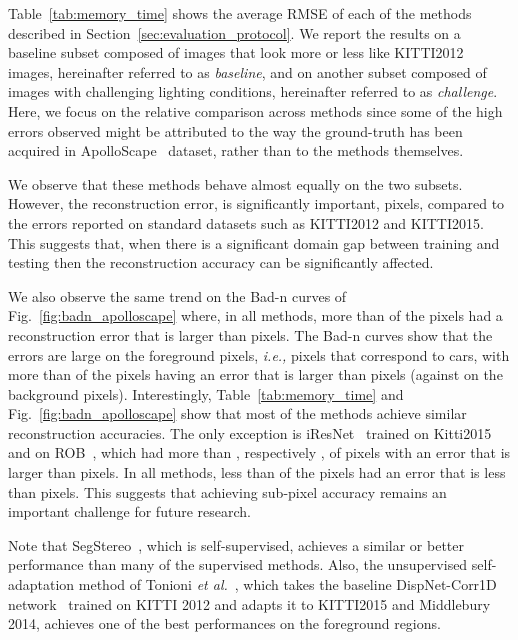 \documentclass[10pt,journal,compsoc]{IEEEtran}
\newcommand{\ie}{\emph{i.e., }}
\newcommand{\etal}{\emph{et al.}}
\begin{document}
 
Table~\ref{tab:memory_time}  shows the   average RMSE of each of the methods described in Section~\ref{sec:evaluation_protocol}.  We report the results on a baseline subset composed of  images that look more or less like KITTI2012 images, hereinafter referred to as \emph{baseline}, and on another subset composed of  images with challenging lighting conditions, hereinafter referred to as \emph{challenge}.  Here, we focus on the relative comparison across methods since some of the high errors observed  might be attributed to the way the ground-truth has been acquired in ApolloScape~\cite{wang2019apolloscape} dataset, rather than to the methods themselves. 


We observe that  these methods behave almost equally on the two subsets. However,  the reconstruction error,  is significantly important,  pixels, compared to the errors reported on standard datasets such as KITTI2012 and KITTI2015.  This suggests that, when there is a significant domain gap between training and testing then the reconstruction accuracy can be significantly affected. 

We also observe the same trend on the Bad-n curves of Fig.~\ref{fig:badn_apolloscape} where, in all methods, more than  of the pixels had a reconstruction error that is larger than  pixels.  
The  Bad-n   curves  show that the errors are  large on the foreground pixels, \ie pixels that correspond to cars, with more than  of the pixels having an error that is larger than  pixels (against  on the background pixels).  Interestingly, Table~\ref{tab:memory_time} and Fig.~\ref{fig:badn_apolloscape} show that most of the methods achieve similar reconstruction accuracies. The only exception is iResNet~\cite{liang2018learning} trained on Kitti2015 and on ROB~\cite{rob}, which had more than , respectively , of pixels with an error that is larger than  pixels.  In all methods, less than  of the pixels had an error that is less than  pixels. This suggests that achieving sub-pixel accuracy remains an important challenge for future research.

Note that SegStereo~\cite{yang2018segstereo}, which is self-supervised, achieves a similar or better performance than many of the supervised methods. Also, the unsupervised self-adaptation method of Tonioni \etal~\cite{tonioni2017unsupervised}, which takes the baseline DispNet-Corr1D network~\cite{mayer2016large} trained on KITTI 2012 and adapts it to KITTI2015 and Middlebury 2014, achieves one of the best performances on the foreground regions.
\end{document}
